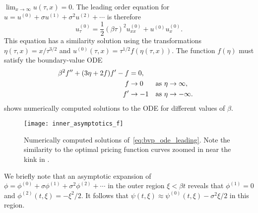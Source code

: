 \documentclass[main.tex]{subfiles}
\begin{document}
$\lim_{x\to \infty}u(\tau,x) = 0$.
The leading order equation for $u = u^{(0)}+\sigma u^{(1)}+\sigma^2 u^{(2)}+\cdots$ is therefore
\begin{equation}
  u^{(0)}_\tau = \frac{1}{2}{(\beta \tau)}^2u^{(0)}_{xx} + u^{(0)}u^{(0)}_x.
\end{equation}
This equation has a similarity solution using the transformations
$\eta(\tau,x)= x/\tau^{3/2}$ and $u^{(0)}(\tau,x) = \tau^{1/2}f(\eta(\tau,x))$.
The function $f(\eta)$ must satisfy the boundary-value ODE
\begin{align}\label{eq:bvp_ode_leading}
  \beta^2f^{\prime\prime} + (3\eta + 2f)f^\prime - f
  &= 0,\\
  f&\to 0 &\textnormal{as } \eta&\to \infty,\\
  f^\prime &\to -1&\textnormal{as } \eta&\to -\infty.
\end{align}
 shows numerically computed solutions to the
ODE for different values of $\beta$.
\begin{figure}[hbt]
  \centering
  \texttt{[image: inner\_asymptotics\_f]}
  \caption{Numerically computed solutions of~\eqref{eq:bvp_ode_leading}.
    Note the similarity to the optimal pricing function curves zoomed
    in near the kink in .
  }\label{fig:inner_leading_f}
\end{figure}

We briefly note that an asymptotic expansion of
$\phi=\phi^{(0)}+\sigma\phi^{(1)}+\sigma^2\phi^{(2)}+\cdots$
in the outer region $\xi<\beta t$ reveals that $\phi^{(1)}=0$ and
$\phi^{(2)}(t,\xi)=-\xi^2/2$. It follows that
$\psi(t,\xi)\approx \psi^{(0)}(t,\xi)-\sigma^2 \xi/2$ in this region.

\biblio{} %
\end{document}
